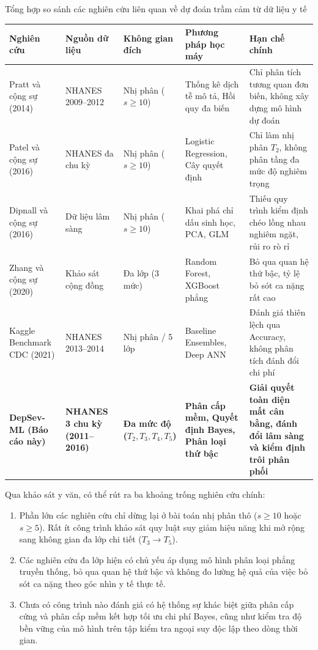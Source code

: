 \begin{table}{Tổng hợp so sánh các nghiên cứu liên quan về dự đoán trầm cảm từ dữ liệu y tế}
\centering
\footnotesize
\setlength{\tabcolsep}{3pt}
\label{tab:related-works}
\begin{tabularx}{\textwidth}{p{3.2cm} p{2.2cm} p{2.4cm} p{2.8cm} X}
\toprule
\textbf{Nghiên cứu} & \textbf{Nguồn dữ liệu} & \textbf{Không gian đích} & \textbf{Phương pháp học máy} & \textbf{Hạn chế chính} \\
\midrule
Pratt và cộng sự (2014) \cite{pratt1991discriminant} & NHANES 2009--2012 & Nhị phân ($s \ge 10$) & Thống kê dịch tễ mô tả, Hồi quy đa biến & Chỉ phân tích tương quan đơn biến, không xây dựng mô hình dự đoán \\
\midrule
Patel và cộng sự (2016) & NHANES đa chu kỳ & Nhị phân ($s \ge 10$) & Logistic Regression, Cây quyết định & Chỉ làm nhị phân $T_2$, không phân tầng đa mức độ nghiêm trọng \\
\midrule
Dipnall và cộng sự (2016) & Dữ liệu lâm sàng & Nhị phân ($s \ge 10$) & Khai phá chỉ dấu sinh học, PCA, GLM & Thiếu quy trình kiểm định chéo lồng nhau nghiêm ngặt, rủi ro rò rỉ \\
\midrule
Zhang và cộng sự (2020) & Khảo sát cộng đồng & Đa lớp (3 mức) & Random Forest, XGBoost phẳng & Bỏ qua quan hệ thứ bậc, tỷ lệ bỏ sót ca nặng rất cao \\
\midrule
Kaggle Benchmark CDC (2021) & NHANES 2013--2014 & Nhị phân / 5 lớp & Baseline Ensembles, Deep ANN & Đánh giá thiên lệch qua Accuracy, không phân tích đánh đổi chi phí \\
\midrule
\textbf{DepSev-ML (Báo cáo này)} & \textbf{NHANES 3 chu kỳ (2011--2016)} & \textbf{Đa mức độ ($T_2, T_3, T_4, T_5$)} & \textbf{Phân cấp mềm, Quyết định Bayes, Phân loại thứ bậc} & \textbf{Giải quyết toàn diện mất cân bằng, đánh đổi lâm sàng và kiểm định trôi phân phối} \\
\bottomrule
\end{tabularx}
\end{table}

Qua khảo sát y văn, có thể rút ra ba khoảng trống nghiên cứu chính:
\begin{enumerate}
    \item Phần lớn các nghiên cứu chỉ dừng lại ở bài toán nhị phân thô ($s \ge 10$ hoặc $s \ge 5$). Rất ít công trình khảo sát quy luật suy giảm hiệu năng khi mở rộng sang không gian đa lớp chi tiết ($T_3 \to T_5$).
    \item Các nghiên cứu đa lớp hiện có chủ yếu áp dụng mô hình phân loại phẳng truyền thống, bỏ qua quan hệ thứ bậc và không đo lường hệ quả của việc bỏ sót ca nặng theo góc nhìn y tế thực tế.
    \item Chưa có công trình nào đánh giá có hệ thống sự khác biệt giữa phân cấp cứng và phân cấp mềm kết hợp tối ưu chi phí Bayes, cũng như kiểm tra độ bền vững của mô hình trên tập kiểm tra ngoại suy độc lập theo dòng thời gian.
\end{enumerate}

